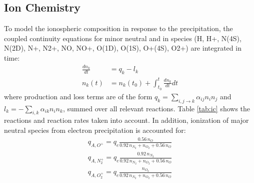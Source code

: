 \documentclass[10pt, a4paper]{article}
\numberwithin{equation}{section}										%
\begin{document}
\subsection{Ion Chemistry}
To model the ionospheric composition in response to the precipitation, the coupled continuity equations for minor neutral and in species (H, H+, N(4S), N(2D), N+, N2+, NO, NO+, O(1D), O(1S), O+(4S), O2+) are integrated in time:
\begin{align}
	\frac{dn_k}{dt} &= q_k - l_k\\
	\label{eq:ode}
	n_k(t) &= n_k(t_0) + \int_{t_0}^t \frac{dn_k}{dt} dt
\end{align}
where production and loss terms are of the form $q_k = \sum_{i, j \rightarrow k} \alpha_{ij} n_i n_j$ and $l_k = -\sum_{i, k} \alpha_{ik} n_i n_k$, summed over all relevant reactions. Table \ref{tab:ic} shows the reactions and reaction rates taken into account. In addition, ionization of major neutral species from electron precipitation is accounted for:
\begin{align}
	q_{A, O^+}  = q_e \frac {0.56 \, n_O}{0.92\, n_{N_2} + n_{O_2} + 0.56\, n_O}\\
	q_{A, N_2^+} = q_e \frac {0.92\, n_{N_2}}{0.92\, n_{N_2} + n_{O_2} + 0.56 \,n_O}\\
	q_{A, O_2^+} = q_e \frac {n_{O_2}}{0.92\, n_{N_2} + n_{O_2} + 0.56\, n_O}
\end{align}
%
\end{document}
